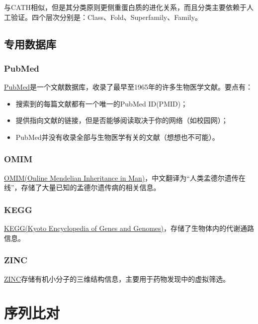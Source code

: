 与CATH相似，但是其分类原则更侧重蛋白质的进化关系，而且分类主要依赖于人工验证。四个层次分别是：Class、Fold、Superfamily、Family。

\subsection{专用数据库}

\subsubsection{PubMed}

\href{https://pubmed.ncbi.nlm.nih.gov/}{PubMed}是一个文献数据库，收录了最早至1965年的许多生物医学文献。要点有：

\begin{itemize}
	\item 搜索到的每篇文献都有一个唯一的PubMed ID(PMID)；
	\item 提供指向文献的链接，但是否能够阅读取决于你的网络（如校园网）；
	\item PubMed并没有收录全部与生物医学有关的文献（想想也不可能）。
\end{itemize}

\subsubsection{OMIM}

\href{https://www.omim.org/}{OMIM(Online Mendelian Inheritance in Man)}，中文翻译为“人类孟德尔遗传在线”，存储了大量已知的孟德尔遗传病的相关信息。

\subsubsection{KEGG}

\href{https://www.genome.jp/kegg/}{KEGG(Kyoto Encyclopedia of Genes and Genomes)}，存储了生物体内的代谢通路信息。

\subsubsection{ZINC}

\href{https://zinc.docking.org/}{ZINC}存储有机小分子的三维结构信息，主要用于药物发现中的虚拟筛选。

\section{序列比对}

